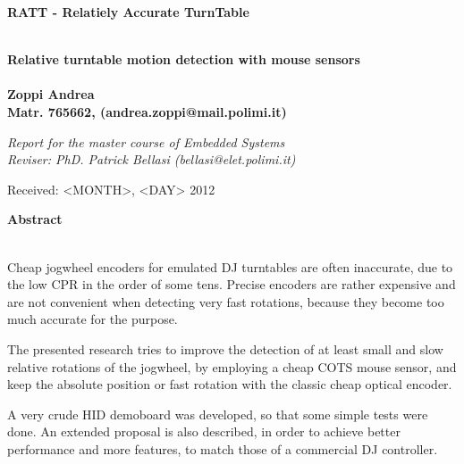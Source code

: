 \documentclass[a4paper,10pt]{article}
\newenvironment*{mytitle}{\begin{LARGE}\bf}{\end{LARGE}\\}%
\newenvironment*{mysubtitle}{\bf}{\\[1.5ex]}%
\newenvironment*{myabstract}{\begin{Large}\bf}{\end{Large}\\[2.5ex]}%
\begin{document}
\newcommand{\TODO}{\textbf{TODO\dots\ }}
\newcommand{\CITEME}{\textbf{[CITEME]}}
\newcommand{\INSFIG}{\textbf{Figure PLACEHOLDER}}


\begin{mytitle}RATT	- Relatiely Accurate TurnTable\end{mytitle}
\begin{mysubtitle}Relative turntable motion detection with mouse sensors\end{mysubtitle}
\\
Zoppi Andrea\\
Matr. 765662, (andrea.zoppi@mail.polimi.it)\\
\begin{flushright}
\emph{Report for the master course of Embedded Systems}\\
\emph{Reviser: PhD. Patrick Bellasi (bellasi@elet.polimi.it)}
\end{flushright}

Received: <MONTH>, <DAY> 2012\\
\hspace{10ex}

\begin{myabstract} Abstract \end{myabstract}
Cheap jogwheel encoders for emulated DJ turntables are often inaccurate, due
to the low CPR in the order of some tens. Precise encoders are rather expensive
and are not convenient when detecting very fast rotations, because they become
too much accurate for the purpose.

The presented research tries to improve the detection of at least small and
slow relative rotations of the jogwheel, by employing a cheap COTS mouse sensor,
and keep the absolute position or fast rotation with the classic cheap optical
encoder.

A very crude HID demoboard was developed, so that some simple tests were done.
An extended proposal is also described, in order to achieve better performance
and more features, to match those of a commercial DJ controller.
\end{document}
